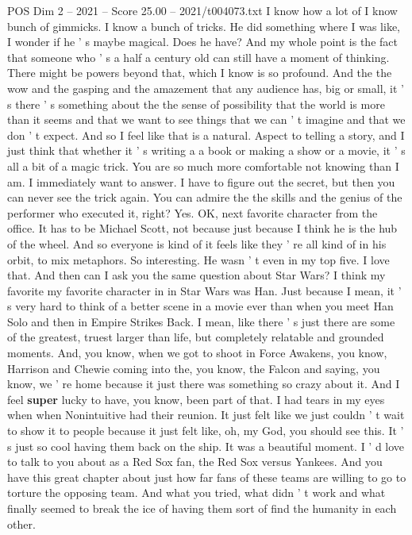 \begin{textsample}{POS Dim 2 – 2021 – Score 25.00 – 2021/t004073.txt}
I know how a lot of I know bunch of gimmicks.
I know a bunch of tricks.
He did something where I was like, I wonder if he ' s maybe magical.
Does he have?
And my whole point is the fact that someone who ' s a half a century old can still have a moment of thinking.
There might be powers beyond that, which I know is so profound.
And the the wow and the gasping and the amazement that any audience has, big or small, it ' s there ' s something about the the sense of possibility that the world is more than it seems and that we want to see things that we can ' t imagine and that we don ' t expect.
And so I feel like that is a natural.
Aspect to telling a story, and I just think that whether it ' s writing a a book or making a show or a movie, it ' s all a bit of a magic trick.
You are so much more comfortable not knowing than I am.
I immediately want to answer.
I have to figure out the secret, but then you can never see the trick again.
You can admire the the skills and the genius of the performer who executed it, right?
Yes.
OK, next favorite character from the office.
It has to be Michael Scott, not because just because I think he is the hub of the wheel.
And so everyone is kind of it feels like they ' re all kind of in his orbit, to mix metaphors.
So interesting.
He wasn ' t even in my top five.
I love that.
And then can I ask you the same question about Star Wars?
I think my favorite my favorite character in in Star Wars was Han.
Just because I mean, it ' s very hard to think of a better scene in a movie ever than when you meet Han Solo and then in Empire Strikes Back.
I mean, like there ' s just there are some of the greatest, truest larger than life, but completely relatable and grounded moments.
And, you know, when we got to shoot in Force Awakens, you know, Harrison and Chewie coming into the, you know, the Falcon and saying, you know, we ' re home because it just there was something so crazy about it.
And I feel \textbf{super} lucky to have, you know, been part of that.
I had tears in my eyes when when Nonintuitive had their reunion.
It just felt like we just couldn ' t wait to show it to people because it just felt like, oh, my God, you should see this.
It ' s just so cool having them back on the ship.
It was a beautiful moment.
I ' d love to talk to you about as a Red Sox fan, the Red Sox versus Yankees.
And you have this great chapter about just how far fans of these teams are willing to go to torture the opposing team.
And what you tried, what didn ' t work and what finally seemed to break the ice of having them sort of find the humanity in each other.

\end{textsample}
